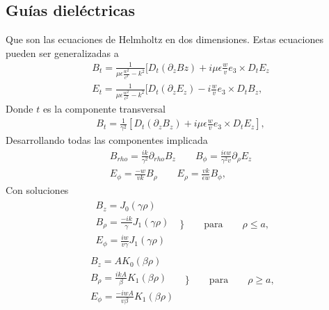 \subsection{Guías dieléctricas}
Que son las ecuaciones de Helmholtz en dos dimensiones. Estas ecuaciones pueden ser generalizadas a
\begin{subequations}
	\begin{align}\label{HelmholtzGeneralizado}
	B_{t}=\frac{1}{\mu \epsilon\frac{w^2}{c^2}-k^2}[D_{t} (\partial_{z} B{z})+i\mu\epsilon\frac{w}{v}e_{3}\times D_{t}E_{z} \\
	E_{t}=\frac{1}{\mu \epsilon\frac{w^2}{c^2}-k^2}[D_{t} (\partial_{z} E_{z})-i\frac{w}{v}e_{3}\times D_{t}B_{z}, 
	\end{align}
	\end{subequations}
Donde $t$ es la componente transversal
\begin{subequations}
	\begin{align}
	B_{t}=\frac{1}{\gamma^2} [D_{t}(\partial_{z}B_{z})+i\mu \epsilon \frac{w}{v} e_{3}\times D_{t}E_{z}],
	\end{align}
\end{subequations}
Desarrollando todas las componentes implicada
\begin{subequations}
	\begin{align}
B_{rho} = \frac{ik}{\gamma^2}\partial_{rho}B_{z} \qquad B_{\phi} = \frac{i \epsilon w}{\gamma^2 v} \partial_{\rho} E_{z}\\
E_{\phi} = \frac{-w}{v k }B_{\rho} \qquad E_{\rho} = \frac{v k}{\epsilon w} B_{\phi},
	\end{align}
\end{subequations}
Con soluciones 
\begin{eqnarray}
	\begin{array}{ll}
		B_{z} = J_{0}(\gamma \rho) \qquad \nonumber \\
		B_{\rho } = \frac{-i k}{\gamma} J_{1} (\gamma \rho) \nonumber \\
		E_{\phi} = \frac{i w}{v \gamma} J_{1} (\gamma \rho)
		\end{array} \Bigg\} \qquad \text{para}  \qquad \rho \leq a ,
\end{eqnarray}
\begin{eqnarray}
\begin{array}{ll}
B_{z} = A K_{0}(\beta \rho) \qquad \nonumber \\
B_{\rho } = \frac{i k A}{\beta} K_{1} (\beta \rho) \nonumber \\
E_{\phi} = \frac{-i w A}{v \beta} K_{1} (\beta \rho)
\end{array}  \Bigg\} \qquad \text{para}  \qquad \rho \geq a ,
\end{eqnarray}
